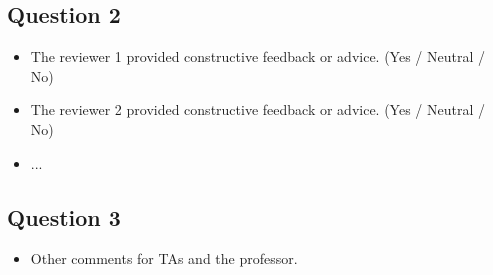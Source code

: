 \documentclass[rebuttal]{cvpr}
\begin{document}
\subsection{Question 2}
\begin{itemize}
    \item The reviewer 1 provided constructive feedback or advice. (Yes / Neutral / No)
    \item The reviewer 2 provided constructive feedback or advice. (Yes / Neutral / No)
    \item ...
\end{itemize}

\subsection{Question 3}
\begin{itemize}
    \item Other comments for TAs and the professor.
\end{itemize}

{\small


}
\end{document}
